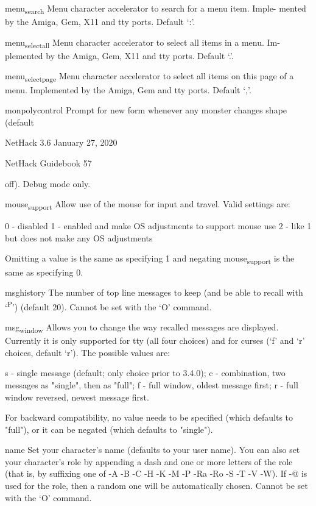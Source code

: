 \documentclass[11pt]{article}
\begin{document}
menu\textsubscript{search}
 Menu character accelerator to search for a menu item. Imple-
 mented by the Amiga, Gem, X11 and tty ports. Default `:'.

menu\textsubscript{select}\textsubscript{all}
 Menu character accelerator to select all items in a menu.  Im-
 plemented by the Amiga, Gem, X11 and tty ports. Default `.'.

menu\textsubscript{select}\textsubscript{page}
 Menu character accelerator to select all items on this page of
 a menu. Implemented by the Amiga, Gem and tty ports.  Default
 `,'.

monpolycontrol
 Prompt for new form whenever any monster changes shape (default


NetHack 3.6                   January 27, 2020





NetHack Guidebook                       57



off). Debug mode only.

mouse\textsubscript{support}
 Allow use of the mouse for input and travel.  Valid settings
 are:

0 - disabled
1 - enabled and make OS adjustments to support mouse use
2 - like 1 but does not make any OS adjustments

Omitting a value is the same as specifying 1 and negating
mouse\textsubscript{support} is the same as specifying 0.

msghistory
 The number of top line messages to keep (and be able to recall
 with `\textsuperscript{P}') (default 20). Cannot be set with the `O' command.

msg\textsubscript{window}
 Allows you to change the way recalled messages are displayed.
 Currently it is only supported for tty (all four choices) and
 for curses (`f' and `r' choices, default `r'). The possible
 values are:

s - single message (default; only choice prior to 3.4.0);
c - combination, two messages as "single", then as "full";
f - full window, oldest message first;
r - full window reversed, newest message first.

For backward compatibility, no value needs to be specified
(which defaults to "full"), or it can be negated (which
defaults to "single").

name
 Set your character's name (defaults to your user name).  You
 can also set your character's role by appending a dash and one
 or more letters of the role (that is, by suffixing one of -A -B
 -C -H -K -M -P -Ra -Ro -S -T -V -W). If -@ is used for the
 role, then a random one will be automatically chosen.  Cannot
 be set with the `O' command.
\end{document}
